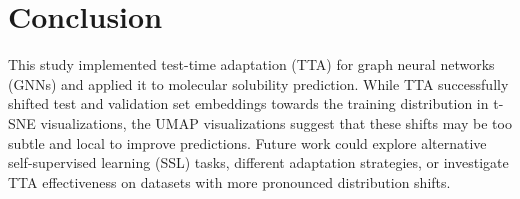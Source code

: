 \documentclass[11pt,a4paper]{article}
\begin{document}
\section{Conclusion}

This study implemented test-time adaptation (TTA) for graph neural networks (GNNs) and applied it to molecular solubility prediction. While TTA successfully shifted test and validation set embeddings towards the training distribution in t-SNE visualizations, the UMAP visualizations suggest that these shifts may be too subtle and local to improve predictions. Future work could explore alternative self-supervised learning (SSL) tasks, different adaptation strategies, or investigate TTA effectiveness on datasets with more pronounced distribution shifts.



\end{document}
